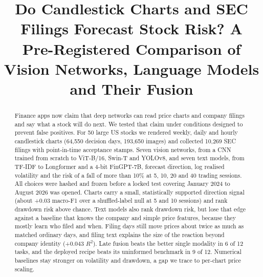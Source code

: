 \documentclass[conference]{IEEEtran}
\begin{document}
\title{Do Candlestick Charts and SEC Filings Forecast Stock Risk? A Pre-Registered Comparison of Vision Networks, Language Models and Their Fusion}

\author{
}

\maketitle

\begin{abstract}
Finance apps now claim that deep networks can read price charts and company filings and say what a stock will do next. We tested that claim under conditions designed to prevent false positives. For 50 large US stocks we rendered weekly, daily and hourly candlestick charts (64,550 decision days, 193,650 images) and collected 10,269 SEC filings with point-in-time acceptance stamps. Seven vision networks, from a CNN trained from scratch to ViT-B/16, Swin-T and YOLOv8, and seven text models, from TF-IDF to Longformer and a 4-bit FinGPT-7B, forecast direction, log realised volatility and the risk of a fall of more than 10\% at 5, 10, 20 and 40 trading sessions. All choices were hashed and frozen before a locked test covering January 2024 to August 2026 was opened. Charts carry a small, statistically supported direction signal (about +0.03 macro-F1 over a shuffled-label null at 5 and 10 sessions) and rank drawdown risk above chance. Text models also rank drawdown risk, but lose that edge against a baseline that knows the company and simple price features, because they mostly learn who filed and when. Filing days still move prices about twice as much as matched ordinary days, and filing text explains the size of the reaction beyond company identity (+0.043 $R^2$). Late fusion beats the better single modality in 6 of 12 tasks, and the deployed recipe beats its uninformed benchmark in 9 of 12. Numerical baselines stay stronger on volatility and drawdown, a gap we trace to per-chart price scaling.
\end{abstract}
\end{document}
